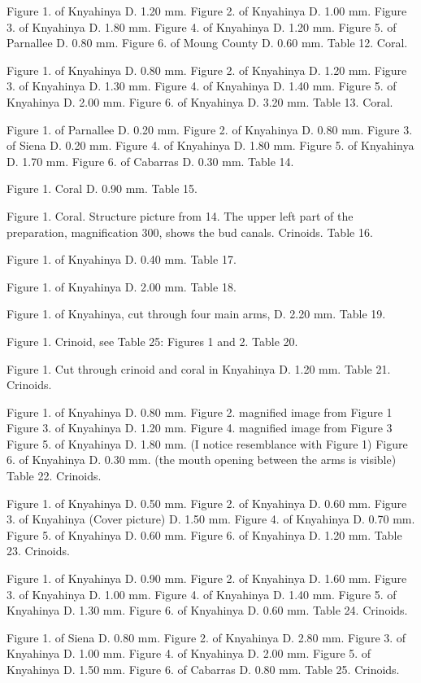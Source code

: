 \documentclass[a4paper, 11pt, oneside]{article}
\begin{document}
Figure 1. of Knyahinya D. 1.20 mm.
Figure 2. of Knyahinya D. 1.00 mm.
Figure 3. of Knyahinya D. 1.80 mm.
Figure 4. of Knyahinya D. 1.20 mm.
Figure 5. of Parnallee D. 0.80 mm.
Figure 6. of Moung County D. 0.60 mm.
Table 12. Coral.

Figure 1. of Knyahinya D. 0.80 mm.
Figure 2. of Knyahinya D. 1.20 mm.
Figure 3. of Knyahinya D. 1.30 mm.
Figure 4. of Knyahinya D. 1.40 mm.
Figure 5. of Knyahinya D. 2.00 mm.
Figure 6. of Knyahinya D. 3.20 mm.
Table 13. Coral.

Figure 1. of Parnallee D. 0.20 mm.
Figure 2. of Knyahinya D. 0.80 mm.
Figure 3. of Siena D. 0.20 mm.
Figure 4. of Knyahinya D. 1.80 mm.
Figure 5. of Knyahinya D. 1.70 mm.
Figure 6. of Cabarras D. 0.30 mm.
Table 14.

Figure 1. Coral D. 0.90 mm.
Table 15.

Figure 1. Coral. Structure picture from 14. The upper left part of the preparation, magnification 300, shows the bud canals.
Crinoids.
Table 16.

Figure 1. of Knyahinya D. 0.40 mm.
Table 17.

Figure 1. of Knyahinya D. 2.00 mm.
Table 18.

Figure 1. of Knyahinya, cut through four main arms, D. 2.20 mm.
Table 19.

Figure 1. Crinoid, see Table 25: Figures 1 and 2.
Table 20.

Figure 1. Cut through crinoid and coral in Knyahinya D. 1.20 mm.
Table 21. Crinoids.

Figure 1. of Knyahinya D. 0.80 mm.
Figure 2. magnified image from Figure 1
Figure 3. of Knyahinya D. 1.20 mm.
Figure 4. magnified image from Figure 3
Figure 5. of Knyahinya D. 1.80 mm. (I notice resemblance with Figure 1)
Figure 6. of Knyahinya D. 0.30 mm. (the mouth opening between the arms is visible)
Table 22. Crinoids.

Figure 1. of Knyahinya D. 0.50 mm.
Figure 2. of Knyahinya D. 0.60 mm.
Figure 3. of Knyahinya (Cover picture) D. 1.50 mm.
Figure 4. of Knyahinya D. 0.70 mm.
Figure 5. of Knyahinya D. 0.60 mm.
Figure 6. of Knyahinya D. 1.20 mm.
Table 23. Crinoids.

Figure 1. of Knyahinya D. 0.90 mm.
Figure 2. of Knyahinya D. 1.60 mm.
Figure 3. of Knyahinya D. 1.00 mm.
Figure 4. of Knyahinya D. 1.40 mm.
Figure 5. of Knyahinya D. 1.30 mm.
Figure 6. of Knyahinya D. 0.60 mm.
Table 24. Crinoids.

Figure 1. of Siena D. 0.80 mm.
Figure 2. of Knyahinya D. 2.80 mm.
Figure 3. of Knyahinya D. 1.00 mm.
Figure 4. of Knyahinya D. 2.00 mm.
Figure 5. of Knyahinya D. 1.50 mm.
Figure 6. of Cabarras D. 0.80 mm.
Table 25. Crinoids.
\end{document}
